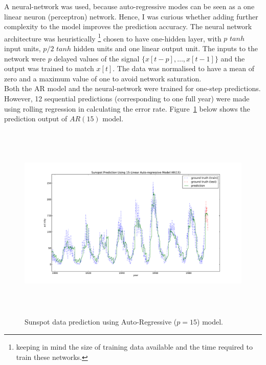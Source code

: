 \documentclass[11pt]{report}
\begin{document}
A neural-network was used, because auto-regressive modes can be seen as a one linear neuron (perceptron) network. Hence, I was curious whether adding further complexity to the model improves the prediction accuracy. The neural network architecture was heuristically \footnote{keeping in mind the size of training data available and the time required to train these networks.} chosen to have one-hidden layer, with $p$ $tanh$ input units, $p/2$ $tanh$ hidden units and one linear output unit. The inputs to the network were $p$ delayed values of the signal $\{x[t-p],\hdots,x[t-1]\}$ and the output was trained to match $x[t]$. The data was normalised to have a mean of zero and a maximum value of one to avoid network saturation.\\

Both the AR model and the neural-network were trained for one-step predictions. However, 12 sequential  predictions (corresponding to one full year) were made using rolling regression in calculating the error rate. Figure~\ref{fig:ss} below shows the prediction output of $AR(15)$ model.
\begin{figure}[hbp]
\begin{center}
\includegraphics[width=18cm,height=9.5cm]{figs/ss_AR15_predict.pdf}
\end{center}
\caption[]{Sunspot data prediction using Auto-Regressive ($p=15$) model.}
\label{fig:ss}
\end{figure}
\clearpage
\end{document}
